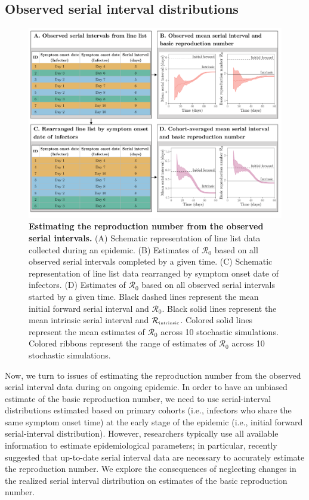 \documentclass[12pt]{article}
\newcommand{\Rx}[1]{\ensuremath{{\mathcal R}_{#1}}\xspace}
\newcommand{\Ro}{\Rx{0}}
\newcommand{\Rintrinsic}{\ensuremath{{\mathcal R}_{\textrm{\tiny intrinsic}}}\xspace}
\begin{document}
\subsection{Observed serial interval distributions}

\begin{figure}[!ht]
\includegraphics[width=\textwidth]{diagram.pdf}
\caption{
\textbf{Estimating the reproduction number from the observed serial intervals.}
(A) Schematic representation of line list data collected during an epidemic.
(B) Estimates of \Ro based on all observed serial intervals completed by a given time.
(C) Schematic representation of line list data rearranged by symptom onset date of infectors.
(D) Estimates of \Ro based on all observed serial intervals started by a given time. 
Black dashed lines represent the mean initial forward serial interval and \Ro.
Black solid lines represent the mean intrinsic serial interval and \Rintrinsic.
Colored solid lines represent the mean estimates of \Ro across 10 stochastic simulations.
Colored ribbons represent the range of estimates of \Ro across 10 stochastic simulations.
}
\label{fig:obsrR}
\end{figure}

Now, we turn to issues of estimating the reproduction number from the observed serial interval data during on ongoing epidemic.
In order to have an unbiased estimate of the basic reproduction number, we need to use serial-interval distributions estimated based on primary cohorts (i.e., infectors who share the same symptom onset time) at the early stage of the epidemic (i.e., initial forward serial-interval distribution).
However, researchers typically use all available information to estimate epidemiological parameters;
in particular, \cite{thompson2019improved} recently suggested that up-to-date serial interval data are necessary to accurately estimate the reproduction number.
We explore the consequences of neglecting changes in the realized serial interval distribution on estimates of the basic reproduction number.
\end{document}
